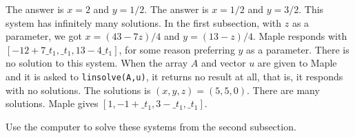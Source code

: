 \begin{exercises}
\begin{answer}
      \begin{exparts}
        \partsitem The answer is \( x=2 \) and \( y=1/2 \).
        \partsitem The answer is \( x=1/2 \) and \( y=3/2 \). 
        \partsitem This system has infinitely many solutions.
           In the first subsection, with $z$ as a parameter, 
           we got $x=(43-7z)/4$ and $y=(13-z)/4$.
           Maple responds with $[-12+7\_t_1,\_t_1,13-4\_t_1]$,
           for some reason preferring $y$ as a parameter.
        \partsitem There is no solution to this system.
           When the array $A$ and vector $u$ are given to Maple
           and it is asked to \texttt{linsolve(A,u)}, 
           it returns no result at all, that is, it responds with
           no solutions.
        \partsitem The solutions is \( (x,y,z)=(5,5,0) \).
        \partsitem There are many solutions.
           Maple gives $[1,-1+\_t_1,3-\_t_1,\_t_1]$.
      \end{exparts}
    \end{answer}
  \item 
    Use the computer to solve these systems from the second subsection.
\end{exercises}
